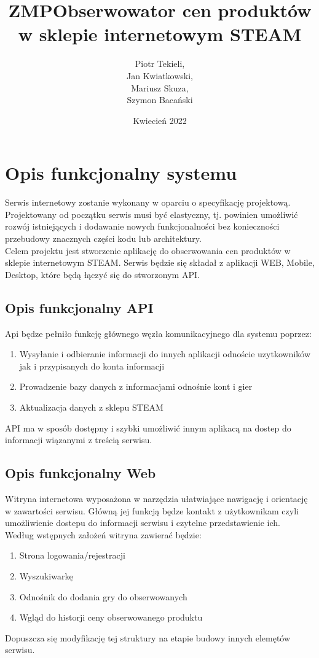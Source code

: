 \documentclass{article}
\title{ZMP\textunderscore Obserwowator cen produktów w sklepie  internetowym STEAM}
\author{
Piotr Tekieli,\\
Jan Kwiatkowski,\\
Mariusz Skuza,\\
Szymon Bacański
}
\date{Kwiecień 2022}
\begin{document}
\maketitle

\section{Opis funkcjonalny systemu}
Serwis internetowy zostanie wykonany w oparciu o specyfikację projektową. Projektowany od początku serwis musi być elastyczny, tj. powinien umożliwić rozwój istniejących i dodawanie nowych funkcjonalności bez konieczności przebudowy znacznych części kodu lub architektury.
\\
Celem projektu jest stworzenie aplikację do obserwowania cen produktów w sklepie internetowym STEAM. Serwis będzie się składał z aplikacji WEB, Mobile, Desktop, które będą łączyć się do stworzonym API.

    \subsection{Opis funkcjonalny API}
        Api będze pełniło funkcję głównego węzła komunikacyjnego dla systemu poprzez:
        \begin{enumerate}
            \item Wysyłanie i odbieranie informacji do innych aplikacji odnoście uzytkowników jak i przypisanych do konta informacji
            \item Prowadzenie bazy danych z informacjami odnośnie kont i gier
            \item Aktualizacja danych z sklepu STEAM 
        \end{enumerate}
        API ma w sposób dostępny i szybki umożliwić innym aplikacą na dostep do informacji wiązanymi z treścią serwisu. 
        
    \subsection{Opis funkcjonalny Web}
         Witryna internetowa wyposażona w narzędzia ułatwiające nawigację i orientację w zawartości serwisu. Główną jej funkcją będze kontakt z użytkownikam czyli umożliwienie dostepu do informacji
         serwisu i czytelne przedstawienie ich.
         \\
         Według wstępnych założeń witryna zawierać będzie:
        \begin{enumerate}
            \item Strona logowania/rejestracji
            \item Wyszukiwarkę
            \item Odnośnik do dodania gry do obserwowanych
            \item Wgląd do historji ceny obserwowanego produktu
        \end{enumerate}
        Dopuszcza się modyfikację tej struktury na etapie budowy innych elemętów serwisu.
        
\end{document}
